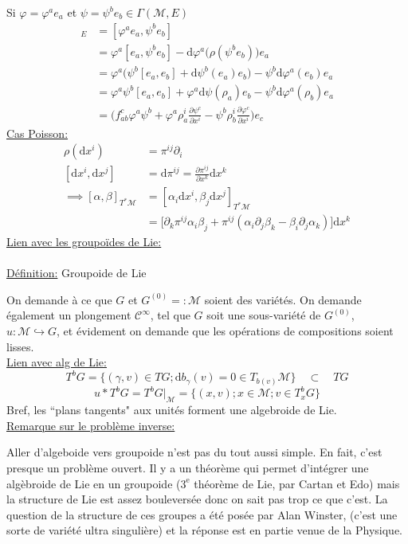 \documentclass[a4paper,11pt]{article}
\renewcommand{\d}{{\mathrm{d}}}
\newcommand{\e}{{\mathrm{e}}}
\newcommand{\dr}[2]{\frac{\partial {#1}}{\partial{#2}}}
\begin{document}
\noindent Si $\varphi = \varphi^a e_a$ et $\psi=\psi^be_b \in \Gamma(\mathcal{M},E)$
\begin{align*}
[\varphi,\psi]_E &= [\varphi^ae_a,\psi^be_b]\\
&= \varphi^a[e_a,\psi^be_b] - \d\varphi^a \Big(\rho(\psi^be_b)\Big)e_a\\
&= \varphi^a\Big(\psi^b[e_a,e_b]+\d\psi^b(e_a)e_b\Big)-\psi^b\d\varphi^a(e_b)e_a\\
&= \varphi^a\psi^b[e_a,e_b] + \varphi^a\d\psi(\rho_a)e_b - \psi^b\d\varphi^a(\rho_b)e_a\\
&=\Big(f^c_{ab}\varphi^a\psi^b + \varphi^a\rho^i_a\dr{\psi^c}{x^i} - \psi^b\rho^i_b \dr{\varphi^c}{x^i}\Big)e_c
\end{align*} 
\underline{Cas Poisson:}
\begin{align*}
\rho(\d x^i) &= \pi^{ij}\partial_i\\
[\d x^i,\d x^j] &= \d \pi^{ij} = \dr{\pi^{ij}}{x^k} \d x^k\\
\implies [\alpha,\beta]_{T^*\mathcal{M}} &= [\alpha_i \d x^i, \beta_j \d x^j]_{T^*\mathcal M}\\
&= \Big[\partial_k \pi^{ij}\alpha_i\beta_j + \pi^{ij}(\alpha_i\partial_j\beta_k - \beta_i \partial_j \alpha_k)\Big]\d x^k
\end{align*}
\underline{Lien avec les groupoïdes de Lie:}\\ \\
\underline{Définition:} Groupoide de Lie

On demande à ce que $G$ et $G^{(0)}=:\mathcal{M}$ soient des variétés. On demande également un plongement $\mathcal{C}^\infty$, tel que $G$ soit une sous-variété de $G^{(0)}$, $u: \mathcal{M}\hookrightarrow G$, et évidement on demande que les opérations de compositions soient lisses.\\


\noindent\underline{Lien avec alg de Lie:}
$$T^bG = \Big\{(\gamma,v) \in TG; \d b_\gamma(v)=0\in T_{b(v)}\mathcal{M}\Big\}\quad\subset\quad TG$$
$$u*T^bG = T^bG|_\mathcal{M} = \Big\{(x,v); x\in \mathcal{M}; v\in T_x ^b G\Big\}$$
Bref, les ``plans tangents" aux unités forment une algebroide de Lie.\\

\noindent\underline{Remarque sur le problème inverse:}

Aller d'algeboide vers groupoide n'est pas du tout aussi simple. En fait, c'est presque un problème ouvert. Il y a un théorème qui permet d'intégrer une algèbroide de Lie en un groupoide ($3^\e$ théorème de Lie, par Cartan et Edo) mais la structure de Lie est assez bouleversée donc on sait pas trop ce que c'est. La question de la structure de ces groupes a été posée par Alan Winster, (c'est une sorte de variété ultra singulière) et la réponse est en partie venue de la Physique.\\
\end{document}
